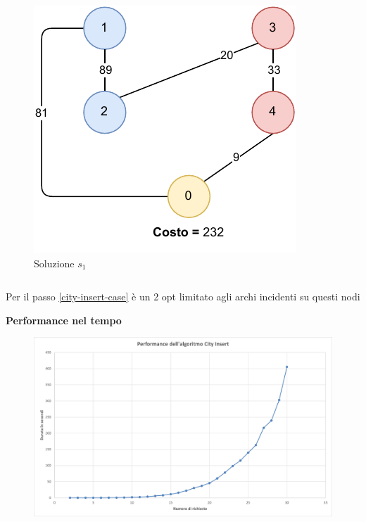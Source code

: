 \documentclass[9pt]{beamer}
\begin{document}
\begin{frame}{\subsecname}
{\begin{columns}[T,onlytextwidth]
\begin{figure}[h]
		\includegraphics[height=0.25\textheight]
		{../images/graph-greedy-pickup-first-solution-tsppd-with-two-customers}	
		\caption{Soluzione $s_1$}
		\end{figure}
	\end{columns}

	Per il passo \ref{city-insert-case} è un 2 opt limitato agli archi incidenti su questi nodi}
	
\framebreak

	\textbf{Performance nel tempo}
      	\begin{figure}[h]
	\centering
	\includegraphics[width=\textwidth]
	{../charts/09 Performance dell'algoritmo City Insert}
	\end{figure}

\end{frame}


\end{document}
